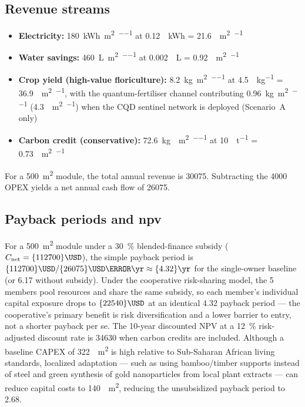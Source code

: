 \documentclass[11pt,a4paper]{article}
\begin{document}
\subsection{Revenue streams}

\begin{itemize}
\item \textbf{Electricity:} \qty{180}{\kWh\per\m\squared\per\yr} at \qty{0.12}{\per\kWh} = \qty{21.6}{\per\m\squared\per\yr}
\item \textbf{Water savings:} \qty{460}{\L\per\m\squared\per\yr} at \qty{0.002}{\per\L} = \qty{0.92}{\per\m\squared\per\yr}
\item \textbf{Crop yield (high-value floriculture):} \qty{8.2}{\kg\per\m\squared\per\yr} at \qty{4.5}{\USD\per\kg} = \qty{36.9}{\per\m\squared\per\yr}, with the quantum-fertiliser channel contributing \qty{0.96}{\kg\per\m\squared\per\yr} (\qty{4.3}{\per\m\squared\per\yr}) when the CQD sentinel network is deployed (Scenario~A only)
\item \textbf{Carbon credit (conservative):} \qty{72.6}{\kg{}\per\m\squared\per\yr} at \qty{10}{\USD\per\tonne} = \qty{0.73}{\per\m\squared\per\yr}
\end{itemize}
For a \qty{500}{\m\squared} module, the total annual revenue is \qty{30075}{\USD}. Subtracting the \qty{4000}{\USD} OPEX yields a net annual cash flow of \qty{26075}{\USD}.

\subsection{Payback periods and npv}

For a \qty{500}{\m\squared} module under a \qty{30}{\percent} blended-finance subsidy ($C_{\mathrm{net}} = \qty{112700}{\USD}$), the simple payback period is $\qty{112700}{\USD} / \qty{26075}{\USD\per\yr} \approx \qty{4.32}{\yr}$ for the single-owner baseline (or \qty{6.17}{\yr} without subsidy). Under the cooperative risk-sharing model, the \num{5} members pool resources and share the same subsidy, so each member's individual capital exposure drops to $\qty{22540}{\USD}$ at an identical \qty{4.32}{\yr} payback period — the cooperative's primary benefit is risk diversification and a lower barrier to entry, not a shorter payback per se. The 10-year discounted NPV at a \qty{12}{\percent} risk-adjusted discount rate is \qty{+34630}{\USD} when carbon credits are included. Although a baseline CAPEX of \qty{322}{\per\m\squared} is high relative to Sub-Saharan African living standards, localized adaptation --- such as using bamboo/timber supports instead of steel and green synthesis of gold nanoparticles from local plant extracts --- can reduce capital costs to \qty{140}{\per\m\squared}, reducing the unsubsidized payback period to \qty{2.68}{\yr}.
\end{document}
